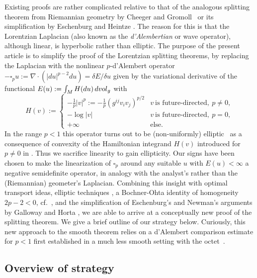 \documentclass[12pt]{amsart}
\newcommand{\vol}{{\rm vol}}
\newcommand{\vg}{\vol_g}
\newcommand{\orange}{\color{orange}}
\begin{document}
Existing proofs are rather complicated relative to that of the analogous 
 splitting theorem from Riemannian geometry by
Cheeger and Gromoll~\cite{CheegerGromoll71} or its simplification by Eschenburg and Heintze \cite{EschenburgHeintze84}.
The reason for this is that the Lorentzian Laplacian
(also known as the {\em d'Alembertian} or wave operator), although linear, is hyperbolic rather than elliptic.  The purpose of the present article is to simplify the proof of the Lorentzian splitting theorems, by replacing the Laplacian with the nonlinear $p$-d'Alembert operator $-\square_p u := \nabla \cdot (|du|^{p-2} du) = \delta E/\delta u$ given by the variational
derivative of the functional $E(u) := \int_M H(du) \, d\vg$ with
\begin{equation}\label{Hamiltonian}
H(v):=%
\begin{cases}
-\frac1p |v|^p := -\frac1p (g^{ij}v_iv_j)^{p/2} & v\ \mbox{is future-directed},\ p \ne 0, \\
-\log |v| & v\ \mbox{is future-directed},\ p=0, \\
+\infty & \mbox{else.}
\end{cases}
\end{equation}
In the range $p<1$ this operator
turns out to be (non-uniformly) elliptic~\cite{BeranOctet24+} as a consequence of convexity of the Hamiltonian integrand $H(v)$ introduced for $p\ne 0$  in \cite{McCann20,Min:19}. 
Thus we sacrifice linearity to gain ellipticity. 
Our signs have been chosen to make the linearization of 
$\square_p$ around any suitable $u$ with $E(u)<\infty$ a negative semidefinite operator, in analogy with %
the analyst's rather than the (Riemannian) geometer's Laplacian.
Combining this insight with optimal transport ideas,
elliptic techniques \cite{GilbargTrudinger98}, 
a Bochner-Ohta identity of homogeneity $2p-2<0$, 
cf.\ \cite{Ohta14h,MondinoSuhr23}, and the simplification of Eschenburg's and Newman's arguments by Galloway and Horta \cite{GallowayHorta96},  we are able to arrive at a 
{conceptually new}
proof of the splitting theorem.
We give a brief outline of our strategy below.
Curiously, this new approach to the smooth theorem 
relies on a d'Alembert comparison estimate for $p<1$ 
first established in a much less smooth setting with the octet~\cite{BeranOctet24+}.

\subsection{Overview of strategy}
\end{document}
